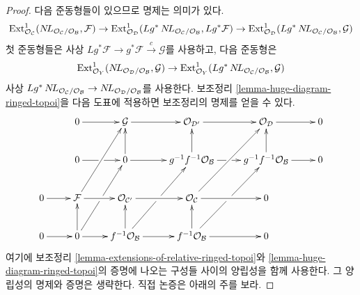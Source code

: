 \begin{proof}
다음 준동형들이 있으므로 명제는 의미가 있다.
$$
\mathop{\mathrm{Ext}}\nolimits^1_{\mathcal{O}_\mathcal{C}}(
\mathop{N\!L}\nolimits_{\mathcal{O}_\mathcal{C}/\mathcal{O}_\mathcal{B}}, \mathcal{F}) \to
\mathop{\mathrm{Ext}}\nolimits^1_{\mathcal{O}_\mathcal{D}}(
Lg^*\mathop{N\!L}\nolimits_{\mathcal{O}_\mathcal{C}/\mathcal{O}_\mathcal{B}}, Lg^*\mathcal{F}) \to
\mathop{\mathrm{Ext}}\nolimits^1_{\mathcal{O}_\mathcal{D}}
(Lg^*\mathop{N\!L}\nolimits_{\mathcal{O}_\mathcal{C}/\mathcal{O}_\mathcal{B}}, \mathcal{G})
$$
첫 준동형들은 사상
$Lg^*\mathcal{F} \to g^*\mathcal{F} \xrightarrow{c} \mathcal{G}$를
사용하고, 다음 준동형은
$$
\mathop{\mathrm{Ext}}\nolimits^1_{\mathcal{O}_Y}(
\mathop{N\!L}\nolimits_{\mathcal{O}_\mathcal{D}/\mathcal{O}_\mathcal{B}}, \mathcal{G}) \to
\mathop{\mathrm{Ext}}\nolimits^1_{\mathcal{O}_Y}(
Lg^*\mathop{N\!L}\nolimits_{\mathcal{O}_\mathcal{C}/\mathcal{O}_\mathcal{B}}, \mathcal{G})
$$
사상 $Lg^*\mathop{N\!L}\nolimits_{\mathcal{O}_\mathcal{C}/\mathcal{O}_\mathcal{B}} \to
\mathop{N\!L}\nolimits_{\mathcal{O}_\mathcal{D}/\mathcal{O}_\mathcal{B}}$를 사용한다.
보조정리 \ref{lemma-huge-diagram-ringed-topoi}을 다음 도표에 적용하면
보조정리의 명제를 얻을 수 있다.
$$
\xymatrix{
& 0 \ar[r] &
\mathcal{G} \ar[r] &
\mathcal{O}_{\mathcal{D}'} \ar[r] &
\mathcal{O}_\mathcal{D} \ar[r] & 0 \\
& 0 \ar[r]|\hole & 0 \ar[u] \ar[r] &
g^{-1}f^{-1}\mathcal{O}_\mathcal{B} \ar[u] \ar[r]|\hole &
g^{-1}f^{-1}\mathcal{O}_\mathcal{B} \ar[u] \ar[r] & 0 \\
0 \ar[r] &
\mathcal{F} \ar[ruu] \ar[r] &
\mathcal{O}_{\mathcal{C}'} \ar[r] &
\mathcal{O}_\mathcal{C} \ar[ruu] \ar[r] & 0 \\
0 \ar[r] & 0 \ar[ruu]|\hole \ar[u] \ar[r] &
f^{-1}\mathcal{O}_\mathcal{B} \ar[ruu]|\hole \ar[u] \ar[r] &
f^{-1}\mathcal{O}_\mathcal{B} \ar[ruu]|\hole \ar[u] \ar[r] & 0
}
$$
여기에 보조정리 \ref{lemma-extensions-of-relative-ringed-topoi}와
\ref{lemma-huge-diagram-ringed-topoi}의 증명에 나오는 구성들 사이의
양립성을 함께 사용한다. 그 양립성의 명제와 증명은 생략한다. 직접
논증은 아래의 주를 보라.
\end{proof}

